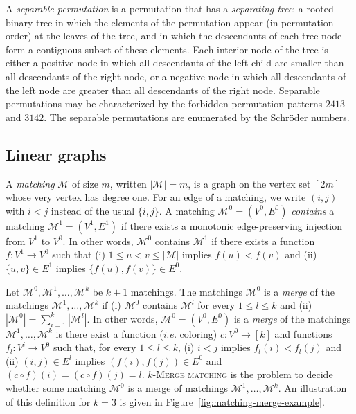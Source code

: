 A \emph{separable permutation} is a permutation that has a \emph{separating tree}:
a rooted binary tree in which the elements
of the permutation appear (in permutation order) at the leaves of the tree,
and in which the descendants of each tree node form a contiguous subset of
these elements.
Each interior node of the tree is either a positive node in which all
descendants of the left child are smaller than all descendants of the right node,
or a negative node in which all descendants of the left node are greater than all
descendants of the right node.
Separable permutations may be characterized by the forbidden permutation
patterns $2413$ and $3142$.
The separable permutations are enumerated by the Schröder numbers.

\subsection*{\textbf{Linear graphs}}

A \emph{matching} $\mathcal{M}$ of size $m$, written $|\mathcal{M}| = m$, 
is a graph on the vertex set $[2m]$ whose very vertex has degree one.
For an edge of a matching, we write $(i, j)$ with $i < j$ instead of the usual $\{i, j\}$.
A matching $\mathcal{M}^0 = (V^0, E^0)$ \emph{contains} a matching 
$\mathcal{M}^1 = (V^1, E^1)$ if there exists a monotonic edge-preserving injection from $V^1$ to $V^0$.
In other words, $\mathcal{M}^0$ contains $\mathcal{M}^1$ if there exists a function 
$f : V^1 \to V^0$ such that 
(i) $1 \leq u < v \leq |\mathcal{M}|$ implies $f(u) < f(v)$ and  
(ii) $\{u, v\} \in E^1$ implies $\{f(u), f(v)\} \in E^0$.

Let $\mathcal{M}^0, \mathcal{M}^1, \dots, \mathcal{M}^k$ be $k+1$ matchings.
The matchings $\mathcal{M}^0$ is a \emph{merge} of the matchings 
$\mathcal{M}^1, \dots, \mathcal{M}^k$ 
if 
(i) $\mathcal{M}^0$ contains $\mathcal{M}^l$ for every $1 \leq l \leq k$ 
and (ii) $\left|\mathcal{M}^0\right| = \sum_{i=1}^{k} \left|\mathcal{M}^l\right|$.
In other words,  $\mathcal{M}^0 = (V^0, E^0)$ is a \emph{merge} of the matchings 
$\mathcal{M}^1, \dots, \mathcal{M}^k$ is there exist a function (\emph{i.e.} coloring)
$c : V^0 \to [k]$  and functions $f_l : V^l \to V^0$ such that, for every $1 \leq l \leq k$,
(i) $i < j$ implies $f_l(i) < f_l(j)$ and  
(ii) $(i, j) \in E^l$ implies $(f(i), f(j)) \in E^0$ and $(c \circ f)(i) = (c \circ f)(j) = l$.
\textsc{$k$-Merge matching} is the problem to decide whether some matching 
$\mathcal{M}^0$ is a merge of matchings $\mathcal{M}^1, \dots, \mathcal{M}^k$.
An illustration of this definition for $k = 3$ is given in Figure~\ref{fig:matching-merge-example}.


